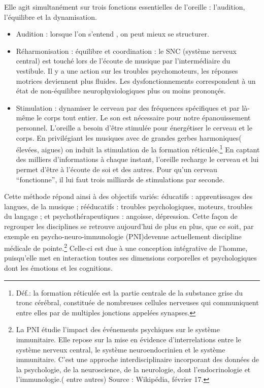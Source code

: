 Elle agit simultanément sur trois fonctions essentielles de l'oreille
: l'audition, l'équilibre et la dynamisation.
\begin{itemize}
\item Audition : lorsque l'on s'entend , on peut mieux se structurer.
\item Réharmonisation : équilibre et coordination : le SNC (système nerveux
central) est touché lors de l'écoute de musique par l'intermédiaire
du vestibule. Il y a une action sur les troubles psychomoteurs, les
réponses motrices deviennent plus fluides. Les dysfonctionnements
correspondent à un état de non-équilibre neurophysiologiques plus
ou moins prononçés. 
\item Stimulation : dynamiser le cerveau par des fréquences spécifiques
et par là-même le corps tout entier. Le son est nécessaire pour notre
épanouissement personnel. L'oreille a besoin d'être stimulée pour
énergétiser le cerveau et le corps. En privilégiant les musiques avec
de grandes gerbes harmoniques( élevées, aigues) on induit la stimulation
de la formation réticulée.\footnote{Déf.: la formation réticulée est la partie centrale de la substance grise du tronc cérébral, constituée de nombreuses cellules nerveuses qui communiquent entre elles par de multiples jonctions appelées synapses.} En captant des milliers d'informations
à chaque instant, l'oreille recharge le cerveau et lui permet d'être
à l'écoute de soi et des autres. Pour qu'un cerveau ``fonctionne'',
il lui faut trois milliards de stimulations par seconde.
\end{itemize}


 
 Cette méthode répond ainsi à des objectifs variés: éducatifs : apprentissages
 des langues, de la musique ; rééducatifs : troubles psychologiques,
 moteurs, troubles du langage ; et psychothérapeutiques : angoisse,
 dépression. Cette façon de regrouper les disciplines se retrouve
 aujourd'hui de plus en plus, que ce soit, par exemple en psycho-neuro-immunologie
 (PNI)devenue actuellement discipline médicale de pointe.\footnote{La PNI étudie l'impact des événements psychiques sur le système immunitaire. Elle repose sur la mise en évidence d'interrelations entre le système
 	nerveux central, le système neuroendocrinien et le système immunitaire.
 	C'est une approche interdisciplinaire incorporant des données de la
 	psychologie, de la neuroscience, de la neurologie, dont l'endocrinologie
 	et l'immunologie.( entre autres) Source : Wikipédia, février 17.}
 Celle-ci est due à une conception intégrative
 de l'homme, puisqu'elle met en interaction toutes ses dimensions corporelles
 et psychologiques dont 
 les émotions et les cognitions.
 





